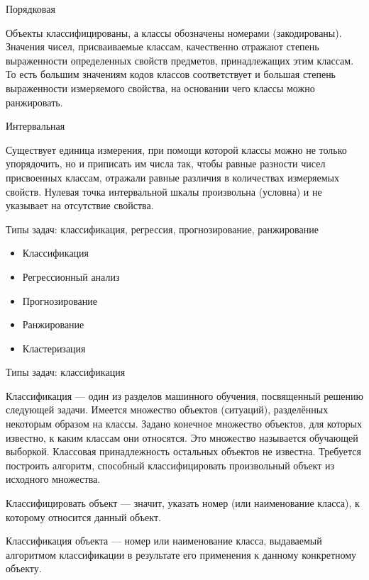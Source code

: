 \documentclass{beamer}
\begin{document}
\begin{frame}{Порядковая}

Объекты классифицированы, а классы обозначены номерами (закодированы). Значения чисел, 
присваиваемые классам, качественно отражают степень выраженности определенных свойств предметов, 
принадлежащих этим классам. То есть большим
значениям кодов классов соответствует и большая
степень выраженности измеряемого свойства, на
основании чего классы можно ранжировать.

\end{frame}

\begin{frame}{Интервальная}

 Существует единица измерения, при помощи которой классы можно не только 
 упорядочить, но и
приписать им числа так, чтобы равные разности
чисел присвоенных классам, отражали равные различия 
в количествах измеряемых свойств. Нулевая
точка интервальной шкалы произвольна (условна)
и не указывает на отсутствие свойства.


  
\end{frame}

\begin{frame}{Типы задач: классификация, регрессия, прогнозирование, ранжирование}

\begin{itemize}
  \item  Классификация
  \item  Регрессионный анализ
  \item  Прогнозирование
  \item  Ранжирование
  \item  Кластеризация 
\end{itemize}

\end{frame}
 

\begin{frame}{Типы задач: классификация}


Классификация — один из разделов машинного обучения, посвященный решению 
следующей задачи. Имеется множество объектов (ситуаций), разделённых некоторым образом на классы. 
Задано конечное множество объектов, для которых известно, к каким классам они относятся. 
Это множество называется обучающей выборкой. Классовая принадлежность остальных 
объектов не известна. Требуется построить алгоритм, способный классифицировать 
произвольный объект из исходного множества.

Классифицировать объект — значит, указать номер (или наименование класса), к которому относится данный объект.

Классификация объекта — номер или наименование класса, выдаваемый алгоритмом 
классификации в результате его применения к данному конкретному объекту.
\end{frame}
 
\end{document}
